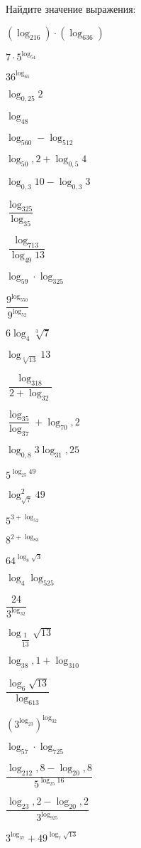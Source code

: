 %
%
\begin{class}[number=1]
	\begin{listofex}
		\item {}
		\item Найдите значение выражения:
			\begin{enumcols}[itemcolumns=2]
				\item \( (\log_216)\cdot(\log_636) \)
				\item \( 7\cdot5^{\log_54} \)
				\item \( 36^{\log_65} \)
				\item \( \log_{0,25}2 \)
				\item \( \log_48 \)
				\item \( \log_560-\log_512 \)
				\item \( \log_50,2+\log_{0,5}4 \)
				\item \( \log_{0,3}10-\log_{0,3}3 \)
				\item \( \dfrac{\log_325}{\log_35} \)
				\item \( \dfrac{\log_713}{\log_{49}13} \)
				\item \( \log_59\cdot\log_325 \)
				\item \( \dfrac{9^{\log_550}}{9^{\log_52}} \)
				\item \( 6\log_4\sqrt[3]{7} \)
				\item \( \log_{\sqrt[6]{13}}13 \)
				\item \( \dfrac{\log_318}{2+\log_32} \)
				\item \( \dfrac{\log_35}{\log_37}+\log_70,2 \)
				\item \( \log_{0,8}3\log_31,25 \)
				\item \( 5^{\log_{25}49} \)
				\item \( \log^2_{\sqrt{7}}49 \)
				\item \( 5^{3+\log_52} \)
				\item \( 8^{2+\log_83} \)
				\item \( 64^{\log_8\sqrt{3}} \)
				\item \( \log_4\log_525 \)
				\item \( \dfrac{24}{3^{\log_32}} \)
				\item \( \log_{\dfrac{1}{13}}\sqrt{13} \)
				\item \( \log_38,1+\log_310 \)
				\item \( \dfrac{\log_6\sqrt{13}}{\log_613} \)
				\item \( \left( 3^{\log_23} \right)^{\log_32}\)
				\item \( \log_57\cdot\log_725 \)
				\item \( \dfrac{\log_212,8-\log_20,8}{5^{\log_{25}16}} \)
				\item \( \dfrac{\log_23,2-\log_20,2}{3^{\log_925}} \)
				\item \( 3^{\log_37}+49^{\log_7{\sqrt{13}}} \)
			\end{enumcols}	
	\end{listofex}
\end{class}
